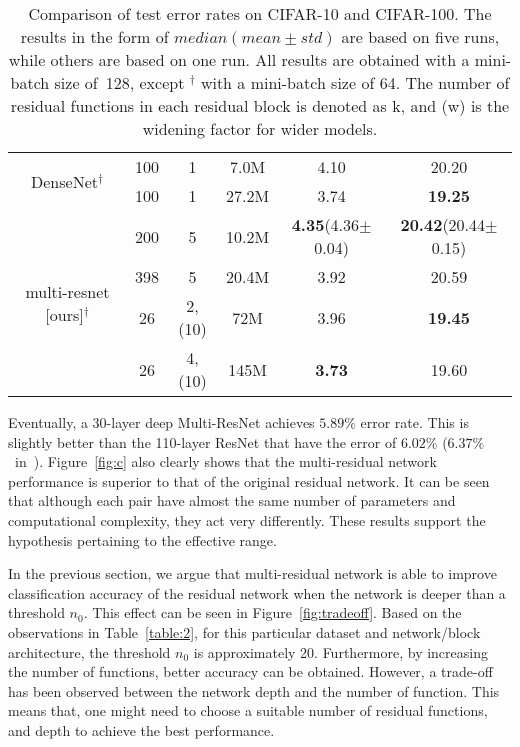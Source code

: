\documentclass[journal]{IEEEtran}
\begin{document}
\begin{table*}[!htp]
\begin{tabular}{||c c c c|c |c||}
\hline
\multirow{2}{8em}{DenseNet\cite{huang2016densely}$^\dagger$} 
& 100 & 1 & 7.0M & 4.10 & 20.20 \\ 
& 100 & 1 & 27.2M & 3.74 & \textbf{19.25} \\ 
\hline
\multirow{4}{8em}{multi-resnet [ours]$^\dagger$} 
& 200 & 5 & 10.2M & \textbf{4.35}\tiny(4.36$\pm$0.04)& \textbf{20.42}\tiny(20.44$\pm$0.15)\\
& 398 & 5 & 20.4M & 3.92 & 20.59 \\
& 26 & 2,(10) & 72M & 3.96 & \textbf{19.45} \\ 
& 26 & 4,(10) &  145M& \textbf{3.73} & 19.60 \\ 


\hline


\end{tabular}
\caption{Comparison of test error rates on CIFAR-10 and CIFAR-100. The results in the form of $median(mean\pm std)$ are based on five runs, while others are based on one run. All results are obtained with a mini-batch size of~128, except $^\dagger$ with a mini-batch size of 64. The number of residual functions in each residual block is denoted as k, and (w) is the widening factor for wider models.}
\label{table:cifar}
\end{table*}



Eventually, a 30-layer deep Multi-ResNet achieves $5.89\%$ error rate. This is slightly better than the 110-layer ResNet that have the error of $6.02\%$ ($6.37\%$~in~\cite{he2016identity}). Figure~\ref{fig:c} also clearly shows that the multi-residual network performance is superior to that of the original residual network. It can be seen that although each pair have almost the same number of parameters and computational complexity, they act very differently. These results support the hypothesis pertaining to the effective range.


In the previous section, we argue that multi-residual network is able to improve classification accuracy of the residual network when the network is deeper than a threshold $n_0$. This effect can be seen in Figure~\ref{fig:tradeoff}. Based on the observations in Table~\ref{table:2}, for this particular dataset and network/block architecture, the threshold $n_0$ is approximately 20. Furthermore, by increasing the number of functions, better accuracy can be obtained. However,  a trade-off has been observed between the network depth and the number of function. This means that, one might need to choose a suitable number of residual functions, and depth to achieve the best performance.
\end{document}
